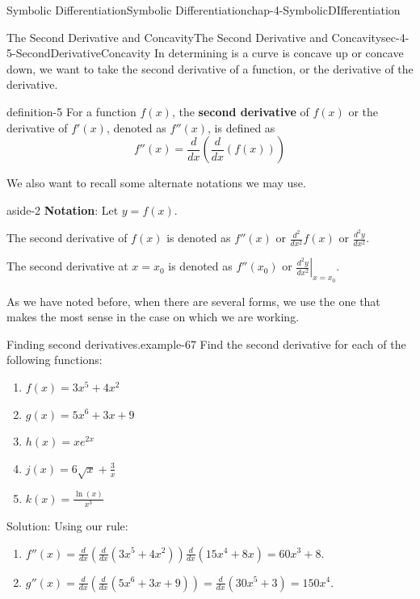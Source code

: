 \documentclass[oneside,10pt,]{book}
\newcommand{\terminology}[1]{\textbf{#1}}
\numberwithin{equation}{section}
\begin{document}
\begin{chapterptx}{Symbolic Differentiation}{}{Symbolic Differentiation}{}{}{chap-4-SymbolicDIfferentiation}
\begin{sectionptx}{The Second Derivative and Concavity}{}{The Second Derivative and Concavity}{}{}{sec-4-5-SecondDerivativeConcavity}
\hypertarget{p-1788}{}%
In determining is a curve is concave up or concave down, we want to take the second derivative of a function, or the derivative of the derivative.%
\begin{definition}{}{definition-5}%
\hypertarget{p-1789}{}%
For a function \(f(x)\), the \terminology{second derivative} of \(f(x)\) or the derivative of \(f'(x)\), denoted as \(f''(x)\),   is defined as%
%
\begin{equation*}
f''(x)=\frac{d}{dx}\left(\frac{d}{dx}\left( f(x)\right)\right) 
\end{equation*}
\end{definition}
\hypertarget{p-1790}{}%
We also want to recall some alternate notations we may use.%
\begin{aside}{}{aside-2}%
\hypertarget{p-1791}{}%
\terminology{Notation}:  Let \(y=f(x)\).%
\par
\hypertarget{p-1792}{}%
The second derivative of \(f(x)\)  is denoted as \(f''(x)\) or  \(\frac{d^2}{dx^2}f(x)\) or \(\frac{d^2y}{dx^2}\).%
\par
\hypertarget{p-1793}{}%
The second derivative at \(x=x_0\) is denoted as \(f''(x_0 )\) or \(\left.\frac{d^2y}{dx^2}\right|_{x=x_0}\).%
\end{aside}
\hypertarget{p-1794}{}%
As we have noted before, when there are several forms, we use the one that makes the most sense in the case on which we are working.%
\begin{example}{Finding second derivatives.}{example-67}%
\hypertarget{p-1795}{}%
Find the second derivative for each of the following functions:%
\leavevmode%
\begin{enumerate}[label=(\alph*)]
\item\hypertarget{li-520}{}\(f(x)=3x^5+4x^2\)%
\item\hypertarget{li-521}{}\(g(x)=5 x^6+3x+9\)%
\item\hypertarget{li-522}{}\(h(x)=x e^{2x}\)%
\item\hypertarget{li-523}{}\(j(x)=6 \sqrt{x}+\frac{3}{x}\)%
\item\hypertarget{li-524}{}\(k(x)=\frac{\ln(x)}{x^3} \)%
\end{enumerate}
\hypertarget{p-1796}{}%
Solution: Using our rule:%
\leavevmode%
\begin{enumerate}[label=(\alph*)]
\item\hypertarget{li-525}{}\(f''(x)=\frac{d}{dx}(\frac{d}{dx}( 3x^5+4x^2 ))\frac{d}{dx} (15x^4+8x)=60x^3+8.\)%
\item\hypertarget{li-526}{}\(g''(x)=\frac{d}{dx} (\frac{d}{dx}  (5 x^6+3x+9))=\frac{d}{dx} (30x^5+3)=150x^4.\)%

\end{enumerate}
\end{example}
\end{sectionptx}
\end{chapterptx}
\end{document}
